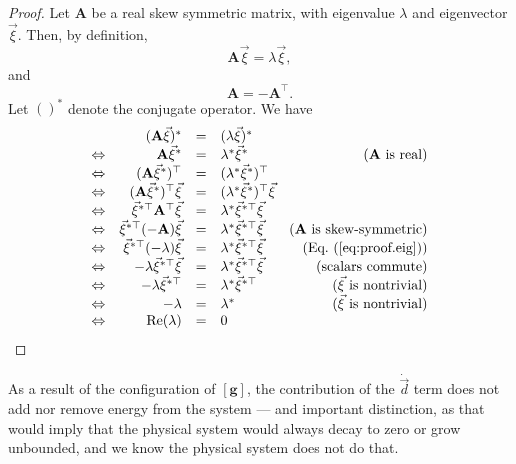 \begin{proof}
Let $\mathbf{A}$ be a real skew symmetric matrix, with eigenvalue $\lambda$ and eigenvector $\vec\xi$. Then, by definition,
\begin{equation}
\mathbf{A}\vec\xi = \lambda\vec\xi,
\label{eq:proof.eig}
\end{equation}
and 
\begin{equation}
\mathbf{A} = -\mathbf{A}^\top.
\end{equation}
Let $()^*$ denote the conjugate operator. We have
\begin{equation}
\begin{array}{rrclr}
 & (\mathbf{A}\vec\xi)^* &=& (\lambda\vec\xi)^* & \\
\Leftrightarrow & \mathbf{A}\vec\xi^* &=& \lambda^*\vec\xi^* & (\mathbf{A}\text{ is real}) \\
\Leftrightarrow & (\mathbf{A}\vec\xi^*)^\top &=& (\lambda^*\vec\xi^*)^\top & \\
\Leftrightarrow & (\mathbf{A}\vec\xi^*)^\top\vec\xi &=& (\lambda^*\vec\xi^*)^\top\vec\xi & \\
\Leftrightarrow & \vec\xi^{*\top}\mathbf{A}^\top\vec\xi &=& \lambda^*\vec\xi^{*\top}\vec\xi & \\
\Leftrightarrow & \vec\xi^{*\top}(\mathbf{-A})\vec\xi &=& \lambda^*\vec\xi^{*\top}\vec\xi & (\mathbf{A}\text{ is skew-symmetric}) \\
\Leftrightarrow & \vec\xi^{*\top}(-\lambda)\vec\xi &=& \lambda^*\vec\xi^{*\top}\vec\xi & (\text{Eq.~(\ref{eq:proof.eig})}) \\
\Leftrightarrow & -\lambda\vec\xi^{*\top}\vec\xi &=& \lambda^*\vec\xi^{*\top}\vec\xi & (\text{scalars commute}) \\
\Leftrightarrow & -\lambda\vec\xi^{*\top} &=& \lambda^*\vec\xi^{*\top} & (\vec\xi\text{ is nontrivial})\\
\Leftrightarrow & -\lambda &=& \lambda^* & (\vec\xi\text{ is nontrivial})\\
\Leftrightarrow & \text{Re}(\lambda) &=& 0 & \\
\end{array}
\end{equation}
\end{proof}

As a result of the configuration of $\mathbf{[g]}$, the contribution of the $\dot{\vec d}$ term does not add nor remove energy from the system --- and important distinction, as that would imply that the physical system would always decay to zero or grow unbounded, and we know the physical system does not do that.

